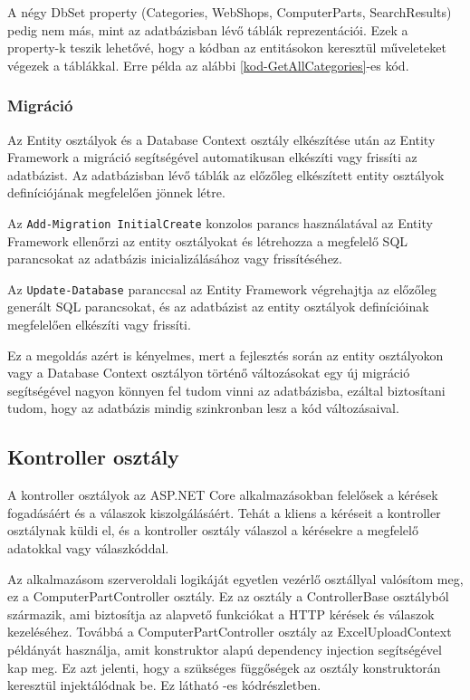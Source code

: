 \documentclass[
]{thesis-ekf}
\theoremstyle{definition}
\theoremstyle{remark}
\begin{document}
A négy DbSet property (Categories, WebShops, ComputerParts, SearchResults) pedig nem más, mint az adatbázisban lévő táblák reprezentációi. Ezek a property-k teszik lehetővé, hogy a kódban az entitásokon keresztül műveleteket végezek a táblákkal. Erre példa az alábbi \ref{kod-GetAllCategories}-es kód.



\subsubsection{Migráció}
Az Entity osztályok és a Database Context osztály elkészítése után az Entity Framework a migráció segítségével automatikusan elkészíti vagy frissíti az adatbázist. Az adatbázisban lévő táblák az előzőleg elkészített entity osztályok definíciójának megfelelően jönnek létre.

Az \texttt{Add-Migration InitialCreate} konzolos parancs használatával az Entity Framework ellenőrzi az entity osztályokat és létrehozza a megfelelő SQL parancsokat az adatbázis inicializálásához vagy frissítéséhez.

Az \texttt{Update-Database} paranccsal az Entity Framework végrehajtja az előzőleg generált SQL parancsokat, és az adatbázist az entity osztályok definícióinak megfelelően elkészíti vagy frissíti.

Ez a megoldás azért is kényelmes, mert a fejlesztés során az entity osztályokon vagy a Database Context osztályon történő változásokat egy új migráció segítségével nagyon könnyen fel tudom vinni az adatbázisba, ezáltal biztosítani tudom, hogy az adatbázis mindig szinkronban lesz a kód változásaival.	
\subsection{Kontroller osztály}
A kontroller osztályok az ASP.NET Core alkalmazásokban felelősek a kérések fogadásáért és a válaszok kiszolgálásáért. Tehát a kliens a kéréseit a kontroller osztálynak küldi el, és a kontroller osztály válaszol a kérésekre a megfelelő adatokkal vagy válaszkóddal.

Az alkalmazásom szerveroldali logikáját egyetlen vezérlő osztállyal valósítom meg, ez a ComputerPartController osztály. Ez az osztály a ControllerBase osztályból származik, ami biztosítja az alapvető funkciókat a HTTP kérések és válaszok kezeléséhez. Továbbá a ComputerPartController osztály az ExcelUploadContext példányát használja, amit konstruktor alapú dependency injection segítségével kap meg. Ez azt jelenti, hogy a szükséges függőségek az osztály konstruktorán keresztül injektálódnak be. Ez látható -es kódrészletben.

\end{document}
